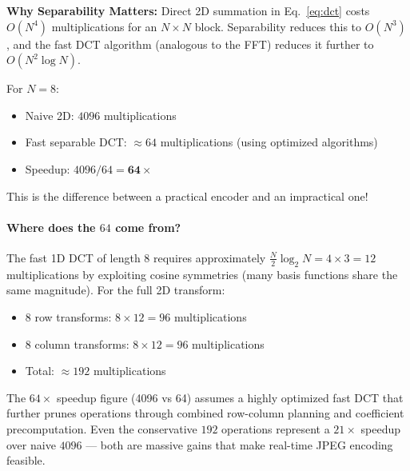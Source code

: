 \begin{importantbox}
\textbf{Why Separability Matters:} Direct 2D summation in Eq.~\eqref{eq:dct} costs $O(N^4)$ multiplications for an $N\times N$ block. Separability reduces this to $O(N^3)$, and the fast DCT algorithm (analogous to the FFT) reduces it further to $O(N^2\log N)$.

For $N=8$:
\begin{itemize}[nosep]
    \item Naive 2D: $4096$ multiplications
    \item Fast separable DCT: $\approx 64$ multiplications (using optimized algorithms)
    \item Speedup: $4096 / 64 = \mathbf{64\times}$
\end{itemize}
This is the difference between a practical encoder and an impractical one!
\end{importantbox}

\paragraph{Where does the $64$ come from?}

The fast 1D DCT of length 8 requires approximately $\frac{N}{2}\log_2 N = 4 \times 3 = 12$ multiplications by exploiting cosine symmetries (many basis functions share the same magnitude). For the full 2D transform:
\begin{itemize}[nosep]
    \item 8 row transforms: $8 \times 12 = 96$ multiplications
    \item 8 column transforms: $8 \times 12 = 96$ multiplications
    \item Total: $\approx 192$ multiplications
\end{itemize}
The $64\times$ speedup figure (4096 vs 64) assumes a highly optimized fast DCT that further prunes operations through combined row-column planning and coefficient precomputation. Even the conservative $192$ operations represent a $21\times$ speedup over naive $4096$ — both are massive gains that make real-time JPEG encoding feasible.


